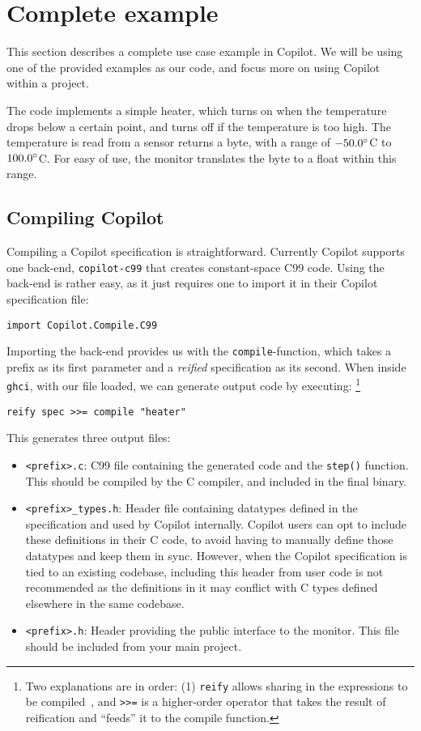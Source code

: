 \section{Complete example}
\label{sec:complete_example}
This section describes a complete use case example in Copilot. We will be using
one of the provided examples as our code, and focus more on using Copilot
within a project.

The code implements a simple heater, which turns on when the temperature drops
below a certain point, and turns off if the temperature is too high. The
temperature is read from a sensor returns a byte, with a range of
$-50.0\degree$C to $100.0\degree$C. For easy of use, the monitor translates the
byte to a float within this range.

\subsection{Compiling Copilot} \label{sec:compiling}

Compiling a Copilot specification is straightforward. Currently Copilot
supports one back-end, \texttt{copilot-c99} that creates constant-space C99
code. Using the back-end is rather easy, as it just requires one to import it in
their Copilot specification file:

\begin{lstlisting}[language = Copilot]
import Copilot.Compile.C99
\end{lstlisting}

Importing the back-end provides us with the \texttt{compile}-function, which
takes a prefix as its first parameter and a \textit{reified} specification as
its second. When inside \texttt{ghci}, with our file loaded, we can generate
output code by executing:
\footnote{Two explanations are in order: (1) {\tt reify} allows sharing in the
expressions to be compiled~\cite{DSLExtract}, and {\tt >>=} is a higher-order
operator that takes the result of reification and ``feeds'' it to the compile
function.}
\begin{lstlisting}[language = Copilot]
reify spec >>= compile "heater"
\end{lstlisting}

This generates three output files:
\begin{itemize}
  \item \texttt{<prefix>.c}: C99 file containing the generated code and the
  \texttt{step()} function. This should be compiled by the C compiler, and
  included in the final binary.
  \item \texttt{<prefix>\_types.h}: Header file containing datatypes defined in the specification and used by Copilot internally. Copilot users can opt to include these definitions in their C code, to avoid having to manually define those datatypes and keep them in sync. However, when the Copilot specification is tied to an existing codebase, including this header from user code is not recommended as the definitions in it may conflict with C types defined elsewhere in the same codebase.
 \item \texttt{<prefix>.h}: Header providing the public interface to the
  monitor. This file should be included from your main project.
\end{itemize}

